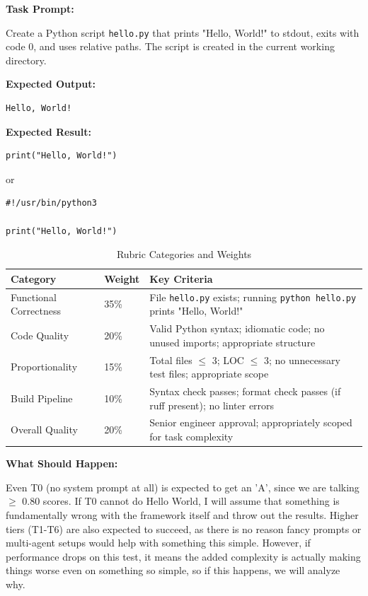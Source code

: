 \documentclass[11pt]{article}
\begin{document}
\textbf{Task Prompt:}

Create a Python script \texttt{hello.py} that prints "Hello, World!" to stdout, exits
with code 0, and uses relative paths. The script is created in the
current working directory.

\textbf{Expected Output:}

\begin{lstlisting}
Hello, World!
\end{lstlisting}

\textbf{Expected Result:}

\begin{lstlisting}
print("Hello, World!")
\end{lstlisting}

or

\begin{lstlisting}
#!/usr/bin/python3

print("Hello, World!")
\end{lstlisting}

\begin{table}[htbp]
\centering
\caption{Rubric Categories and Weights}
\begin{tabularx}{\textwidth}{llX}
\toprule
Category & Weight & Key Criteria \\
\midrule
Functional Correctness & 35\% & File \texttt{hello.py} exists; running \texttt{python hello.py} prints "Hello, World!" \\
Code Quality & 20\% & Valid Python syntax; idiomatic code; no unused imports; appropriate structure \\
Proportionality & 15\% & Total files $\leq$ 3; LOC $\leq$ 3; no unnecessary test files; appropriate scope \\
Build Pipeline & 10\% & Syntax check passes; format check passes (if ruff present); no linter errors \\
Overall Quality & 20\% & Senior engineer approval; appropriately scoped for task complexity \\
\bottomrule
\end{tabularx}
\end{table}


\textbf{What Should Happen:}

Even T0 (no system prompt at all) is expected to get an 'A',
since we are talking $\geq$ 0.80 scores. If T0 cannot do Hello World, I will assume
that something is fundamentally wrong with the framework itself and throw out
the results. Higher tiers (T1-T6) are also expected to succeed, as there is no reason
fancy prompts or multi-agent setups would help with something this simple.
However, if performance drops on this test, it means the added complexity is
actually making things worse even on something so simple, so if this happens, we
will analyze why.
\end{document}
